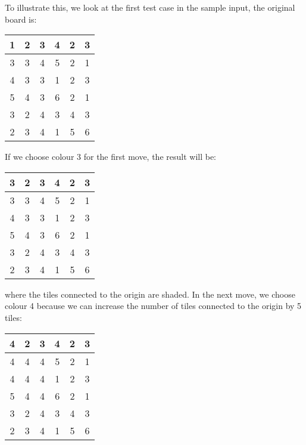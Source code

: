 To illustrate this, we look at the first test case in the sample
input, the original board is:
\begin{center}
  \begin{tabular}{|c|c|c|c|c|c|}\hline
    1 & 2 & 3 & 4 & 2 & 3 \\ \hline
    3 & 3 & 4 & 5 & 2 & 1 \\ \hline
    4 & 3 & 3 & 1 & 2 & 3 \\ \hline
    5 & 4 & 3 & 6 & 2 & 1 \\ \hline
    3 & 2 & 4 & 3 & 4 & 3 \\ \hline
    2 & 3 & 4 & 1 & 5 & 6 \\ \hline
  \end{tabular}
\end{center}
If we choose colour 3 for the first move, the result will be:
\begin{center}
  \begin{tabular}{|c|c|c|c|c|c|}\hline
    \cellcolor{lightgray} 3 & 2 & 3 & 4 & 2 & 3 \\ \hline
    \cellcolor{lightgray}3 & \cellcolor{lightgray}3 & 4 & 5 & 2 & 1 \\ \hline
    4 & \cellcolor{lightgray}3 &\cellcolor{lightgray} 3 & 1 & 2 & 3 \\ \hline
    5 & 4 & \cellcolor{lightgray}3 & 6 & 2 & 1 \\ \hline
    3 & 2 & 4 & 3 & 4 & 3 \\ \hline
    2 & 3 & 4 & 1 & 5 & 6 \\ \hline
  \end{tabular}
\end{center}
where the tiles connected to the origin are shaded.  In the next move,
we choose colour 4 because we can increase the number of tiles connected
to the origin by 5 tiles:
\begin{center}
  \begin{tabular}{|c|c|c|c|c|c|}\hline
    \cellcolor{lightgray} 4 & 2 & 3 & 4 & 2 & 3 \\ \hline
    \cellcolor{lightgray}4 & \cellcolor{lightgray}4 & \cellcolor{lightgray}4 & 5 & 2 & 1 \\ \hline
    \cellcolor{lightgray}4 & \cellcolor{lightgray}4 &\cellcolor{lightgray} 4 & 1 & 2 & 3 \\ \hline
    5 & \cellcolor{lightgray}4 & \cellcolor{lightgray}4 & 6 & 2 & 1 \\ \hline
    3 & 2 & \cellcolor{lightgray}4 & 3 & 4 & 3 \\ \hline
    2 & 3 & \cellcolor{lightgray}4 & 1 & 5 & 6 \\ \hline
  \end{tabular}
\end{center}



